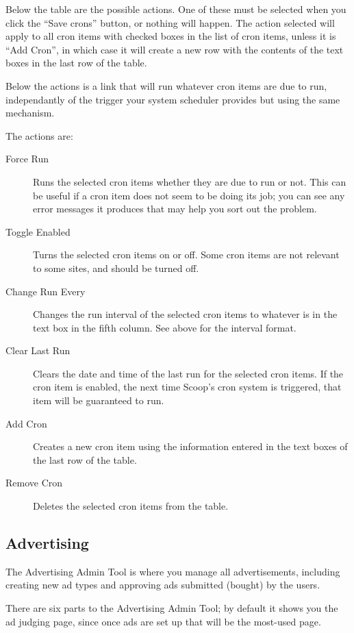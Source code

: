 Below the table are the possible actions.  One of these must be selected when you click the ``Save crons'' button, or nothing will happen.  The action selected will apply to all cron items with checked boxes in the list of cron items, unless it is ``Add Cron'', in which case it will create a new row with the contents of the text boxes in the last row of the table.

Below the actions is a link that will run whatever cron items are due to run, independantly of the trigger your system scheduler provides but using the same mechanism.

The actions are:
\begin{description}
\item[Force Run] Runs the selected cron items whether they are due to run or not.  This can be useful if a cron item does not seem to be doing its job; you can see any error messages it produces that may help you sort out the problem.
\item[Toggle Enabled] Turns the selected cron items on or off.  Some cron items are not relevant to some sites, and should be turned off.
\item[Change Run Every] Changes the run interval of the selected cron items to whatever is in the text box in the fifth column.  See above for the interval format.
\item[Clear Last Run] Clears the date and time of the last run for the selected cron items.  If the cron item is enabled, the next time Scoop's cron system is triggered, that item will be guaranteed to run.
\item[Add Cron] Creates a new cron item using the information entered in the text boxes of the last row of the table.
\item[Remove Cron] Deletes the selected cron items from the table.
\end{description}

\subsection{Advertising}
\label{admin-tools-advertising}

The Advertising Admin Tool is where you manage all advertisements, including creating new ad types and approving ads submitted (bought) by the users.

There are six parts to the Advertising Admin Tool; by default it shows you the ad judging page, since once ads are set up that will be the most-used page.

